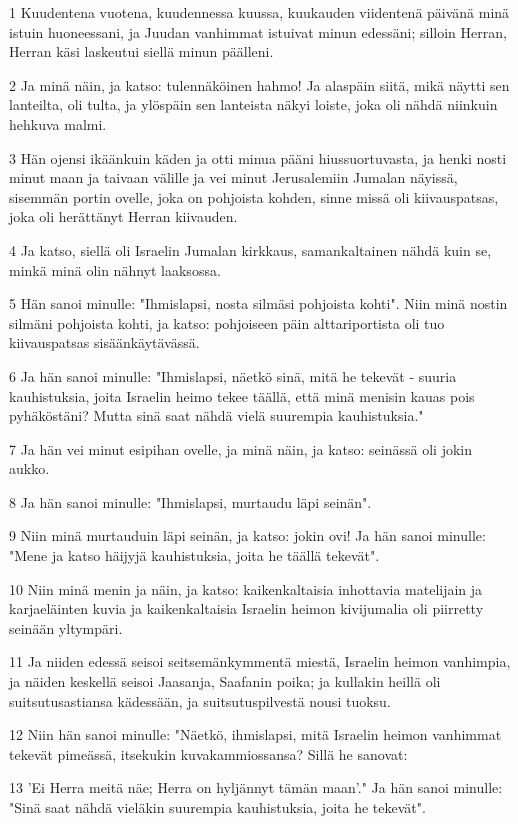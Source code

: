 \par 1 Kuudentena vuotena, kuudennessa kuussa, kuukauden viidentenä päivänä minä istuin huoneessani, ja Juudan vanhimmat istuivat minun edessäni; silloin Herran, Herran käsi laskeutui siellä minun päälleni.
\par 2 Ja minä näin, ja katso: tulennäköinen hahmo! Ja alaspäin siitä, mikä näytti sen lanteilta, oli tulta, ja ylöspäin sen lanteista näkyi loiste, joka oli nähdä niinkuin hehkuva malmi.
\par 3 Hän ojensi ikäänkuin käden ja otti minua pääni hiussuortuvasta, ja henki nosti minut maan ja taivaan välille ja vei minut Jerusalemiin Jumalan näyissä, sisemmän portin ovelle, joka on pohjoista kohden, sinne missä oli kiivauspatsas, joka oli herättänyt Herran kiivauden.
\par 4 Ja katso, siellä oli Israelin Jumalan kirkkaus, samankaltainen nähdä kuin se, minkä minä olin nähnyt laaksossa.
\par 5 Hän sanoi minulle: "Ihmislapsi, nosta silmäsi pohjoista kohti". Niin minä nostin silmäni pohjoista kohti, ja katso: pohjoiseen päin alttariportista oli tuo kiivauspatsas sisäänkäytävässä.
\par 6 Ja hän sanoi minulle: "Ihmislapsi, näetkö sinä, mitä he tekevät - suuria kauhistuksia, joita Israelin heimo tekee täällä, että minä menisin kauas pois pyhäköstäni? Mutta sinä saat nähdä vielä suurempia kauhistuksia."
\par 7 Ja hän vei minut esipihan ovelle, ja minä näin, ja katso: seinässä oli jokin aukko.
\par 8 Ja hän sanoi minulle: "Ihmislapsi, murtaudu läpi seinän".
\par 9 Niin minä murtauduin läpi seinän, ja katso: jokin ovi! Ja hän sanoi minulle: "Mene ja katso häijyjä kauhistuksia, joita he täällä tekevät".
\par 10 Niin minä menin ja näin, ja katso: kaikenkaltaisia inhottavia matelijain ja karjaeläinten kuvia ja kaikenkaltaisia Israelin heimon kivijumalia oli piirretty seinään yltympäri.
\par 11 Ja niiden edessä seisoi seitsemänkymmentä miestä, Israelin heimon vanhimpia, ja näiden keskellä seisoi Jaasanja, Saafanin poika; ja kullakin heillä oli suitsutusastiansa kädessään, ja suitsutuspilvestä nousi tuoksu.
\par 12 Niin hän sanoi minulle: "Näetkö, ihmislapsi, mitä Israelin heimon vanhimmat tekevät pimeässä, itsekukin kuvakammiossansa? Sillä he sanovat:
\par 13 'Ei Herra meitä näe; Herra on hyljännyt tämän maan'." Ja hän sanoi minulle: "Sinä saat nähdä vieläkin suurempia kauhistuksia, joita he tekevät".
